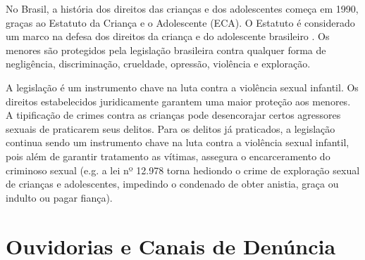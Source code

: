 
No Brasil, a história dos direitos das crianças e dos adolescentes começa em 1990, graças ao Estatuto da Criança e o Adolescente (ECA). O Estatuto é considerado um marco na defesa dos direitos da criança e do adolescente brasileiro \cite{lima2012direitos}. Os menores são protegidos pela legislação brasileira contra qualquer forma de negligência, discriminação, crueldade, opressão, violência e exploração. 


A legislação é um instrumento chave na luta contra a violência sexual infantil. Os direitos estabelecidos juridicamente garantem uma maior proteção aos menores. A tipificação de crimes contra as crianças pode desencorajar certos agressores sexuais de praticarem seus delitos. Para os delitos já praticados, a legislação continua sendo um instrumento chave na luta contra a violência sexual infantil, pois além de garantir tratamento as vítimas, assegura o encarceramento do criminoso sexual (e.g. a lei nº 12.978 torna hediondo o crime de exploração sexual de crianças e adolescentes, impedindo o condenado de obter anistia, graça ou indulto ou pagar fiança).




\section{Ouvidorias e Canais de Denúncia}\label{sec:canais}


